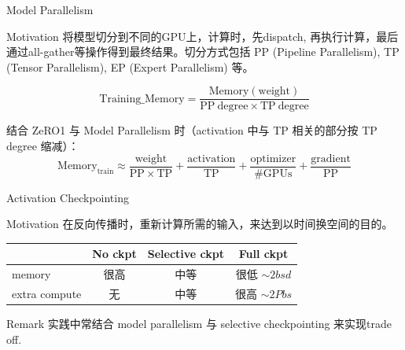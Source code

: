\documentclass[aspectratio=169]{beamer}
\begin{document}
\begin{frame}{Model Parallelism\cite{shoeybi2020megatronlmtrainingmultibillionparameter}}
    \small
    \begin{block}{Motivation}
        将模型切分到不同的GPU上，计算时，先dispatch, 再执行计算，最后通过all-gather等操作得到最终结果。切分方式包括 PP (Pipeline Parallelism), TP (Tensor Parallelism), EP (Expert Parallelism) 等。
    \end{block}
  \begin{equation}
    \mathrm{Training\_Memory}
    = \frac{\mathrm{Memory}(\mathrm{weight})}{\mathrm{PP\ degree} \times \mathrm{TP\ degree}}
  \end{equation}
  
  \vspace{0.2em}
  结合 ZeRO1 与 Model Parallelism 时（activation 中与 TP 相关的部分按 TP degree 缩减）：
  \begin{equation*}
    \mathrm{Memory}_{\mathrm{train}}
    \approx \frac{\mathrm{weight}}{\mathrm{PP}\times\mathrm{TP}}
    + \frac{\mathrm{activation}}{\mathrm{TP}}
    + \frac{\mathrm{optimizer}}{\#\mathrm{GPUs}}
    + \frac{\mathrm{gradient}}{\mathrm{PP}}
  \end{equation*}
\end{frame}


\begin{frame}{Activation Checkpointing\cite{korthikanti_reducing_2022}}
  \small
  \begin{block}{Motivation}
    在反向传播时，重新计算所需的输入，来达到以时间换空间的目的。
\end{block}
  \vspace{0.5em}
  \begin{center}
    \small
    \renewcommand{\arraystretch}{1.25}
    \begin{tabular}{lccc}
      \toprule
      & No ckpt & Selective ckpt & Full ckpt \\
      \midrule
      memory & 很高 & 中等 & 很低 $\sim 2bsd$ \\
      extra compute & 无 & 中等 & 很高 $\sim 2Pbs$ \\
      \bottomrule
    \end{tabular}
  \end{center}
  \begin{block}{Remark}
      实践中常结合 model parallelism 与 selective checkpointing 来实现trade off.
  \end{block}
\end{frame}
\end{document}
